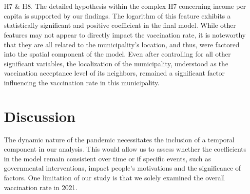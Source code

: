 \documentclass[a4paper,12pt]{article} %
\begin{document}
\\
\\
H7 \& H8. The detailed hypothesis within the complex H7 concerning income per capita is supported by our findings. The logarithm of this feature exhibits a statistically significant and positive coefficient in the final model. While other features may not appear to directly impact the vaccination rate, it is noteworthy that they are all related to the municipality's location, and thus, were factored into the spatial component of the model. Even after controlling for all other significant variables, the localization of the municipality, understood as the vaccination acceptance level of its neighbors, remained a significant factor influencing the vaccination rate in this municipality. 


\section{Discussion}
The dynamic nature of the pandemic necessitates the inclusion of a temporal component in our analysis. This would allow us to assess whether the coefficients in the model remain consistent over time or if specific events, such as governmental interventions, impact people's motivations and the significance of factors. One limitation of our study is that we solely examined the overall vaccination rate in 2021.



\end{document}
